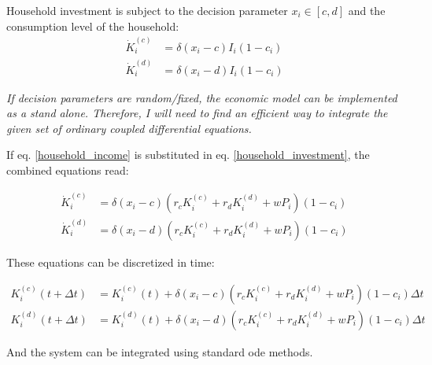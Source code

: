 Household investment is subject to the decision parameter $x_i \in [c,d]$ and the consumption level of the household:
\begin{align}
	\dot{K}_i^{(c)} &= \delta(x_i-c)I_i(1-c_i) \\
	\dot{K}_i^{(d)} &= \delta(x_i-d)I_i(1-c_i)
	\label{household_investment}
\end{align}

\textit{If decision parameters are random/fixed, the economic model can be implemented as a stand alone.
Therefore, I will need to find an efficient way to integrate the given set of ordinary coupled differential equations.}

If eq. \eqref{household_income} is substituted in eq. \eqref{household_investment}, the combined equations read:

\begin{align}
	\dot{K}_i^{(c)} &= \delta(x_i-c)(r_c K_i^{(c)} + r_d K_i^{(d)} + wP_i)(1 -c_i) \\
	\dot{K}_i^{(d)} &= \delta(x_i-d)(r_c K_i^{(c)} + r_d K_i^{(d)} + wP_i)(1 -c_i)
	\label{household_capital_dynamics}
\end{align}

These equations can be discretized in time:

\begin{align}
	K_i^{(c)}(t + \Delta t) &= K_{i}^{(c)}(t) + \delta(x_i-c)(r_c K_i^{(c)} + r_d K_i^{(d)} + wP_i)(1 -c_i)\Delta t \\
	K_i^{(d)}(t + \Delta t) &= K_{i}^{(d)}(t) + \delta(x_i-d)(r_c K_i^{(c)} + r_d K_i^{(d)} + wP_i)(1 -c_i)\Delta t
	\label{household_capital_dynamics_discretized}
\end{align}

And the system can be integrated using standard ode methods.

{}
    
